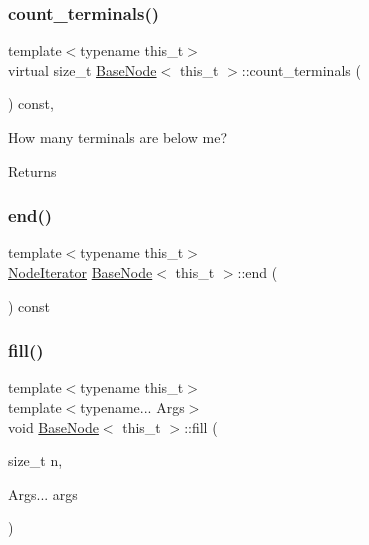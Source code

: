 \subsubsection{\texorpdfstring{count\+\_\+terminals()}{count\_terminals()}}
{\footnotesize\ttfamily template$<$typename this\+\_\+t$>$ \\
virtual size\+\_\+t \hyperlink{class_base_node}{Base\+Node}$<$ this\+\_\+t $>$\+::count\+\_\+terminals (\begin{DoxyParamCaption}{ }\end{DoxyParamCaption}) const\hspace{0.3cm}{\ttfamily [inline]}, {\ttfamily [virtual]}}

How many terminals are below me? \begin{DoxyReturn}{Returns}

\end{DoxyReturn}
\mbox{\label{class_base_node_a990f4bbfab3e8c78421e51f32cb5db48}} 
\subsubsection{\texorpdfstring{end()}{end()}}
{\footnotesize\ttfamily template$<$typename this\+\_\+t$>$ \\
\hyperlink{class_base_node_1_1_node_iterator}{Node\+Iterator} \hyperlink{class_base_node}{Base\+Node}$<$ this\+\_\+t $>$\+::end (\begin{DoxyParamCaption}{ }\end{DoxyParamCaption}) const\hspace{0.3cm}{\ttfamily [inline]}}

\mbox{\label{class_base_node_aa7e88efda898c45f84ab0d79d4bb85c2}} 
\subsubsection{\texorpdfstring{fill()}{fill()}}
{\footnotesize\ttfamily template$<$typename this\+\_\+t$>$ \\
template$<$typename... Args$>$ \\
void \hyperlink{class_base_node}{Base\+Node}$<$ this\+\_\+t $>$\+::fill (\begin{DoxyParamCaption}\item[{size\+\_\+t}]{n,  }\item[{Args...}]{args }\end{DoxyParamCaption})\hspace{0.3cm}{\ttfamily [inline]}}

